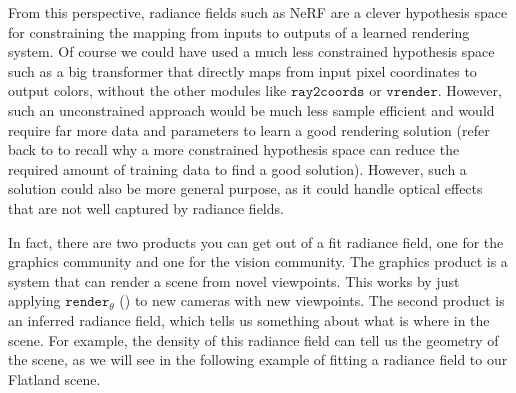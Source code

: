 From this perspective, radiance fields such as NeRF are a clever hypothesis space for constraining the mapping from inputs to outputs of a learned rendering system.
Of course we could have used a much less constrained hypothesis space such as a big transformer that directly maps from input pixel coordinates to output colors,
without the other modules like $\texttt{ray2coords}$ or $\texttt{vrender}$. However, such an unconstrained approach would be much less sample efficient and would require
far more data and parameters to learn a good rendering solution (refer back to \chap{\ref{chapter:problem_of_generalization}} to recall why a more constrained hypothesis
space can reduce the required amount of training data to find a good solution). However, such a solution could also be more general purpose,
as it could handle optical effects that are not well captured by radiance fields.

In fact, there are two products you can get out of a fit radiance field, one for the graphics community and one for the vision community.
The graphics product is a system that can render a scene from novel viewpoints.
This works by just applying $\texttt{render}_{\theta}$ (\fig{\ref{fig:nerfs:full_nerf_pipeline}}) to new cameras with new viewpoints.
The second product is an inferred radiance field, which tells us something about what is where in the scene. For example,
the density of this radiance field can tell us the geometry of the scene, as we will see in the following example of fitting a radiance field to our Flatland scene.

